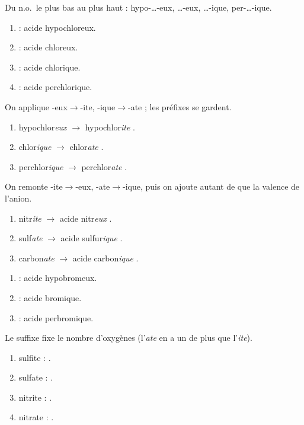 \documentclass[11pt,a4paper]{article}
\begin{document}
\begin{corrige}
Du n.o.\ le plus bas au plus haut : hypo-\ldots-eux, \ldots-eux, \ldots-ique, per-\ldots-ique.
\begin{enumerate}[label=\alph*)]
  \item {} : acide hypochloreux.
  \item {} : acide chloreux.
  \item {} : acide chlorique.
  \item {} : acide perchlorique.
\end{enumerate}
\end{corrige}

\begin{corrige}
On applique -eux$\to$-ite, -ique$\to$-ate ; les préfixes se gardent.
\begin{enumerate}[label=\alph*)]
  \item hypochlor\emph{eux} $\to$ hypochlor\emph{ite} .
  \item chlor\emph{ique} $\to$ chlor\emph{ate} .
  \item perchlor\emph{ique} $\to$ perchlor\emph{ate} .
\end{enumerate}
\end{corrige}

\begin{corrige}
On remonte -ite$\to$-eux, -ate$\to$-ique, puis on ajoute autant de  que la valence de l'anion.
\begin{enumerate}[label=\alph*)]
  \item nitr\emph{ite}  $\to$ acide nitr\emph{eux} .
  \item sulf\emph{ate}  $\to$ acide sulfur\emph{ique} .
  \item carbon\emph{ate}  $\to$ acide carbon\emph{ique} .
\end{enumerate}
\end{corrige}

\begin{corrige}
\begin{enumerate}[label=\alph*)]
  \item {} : acide hypobromeux.
  \item {} : acide bromique.
  \item {} : acide perbromique.
\end{enumerate}
\end{corrige}

\begin{corrige}
Le suffixe fixe le nombre d'oxygènes (l'\emph{ate} en a un de plus que l'\emph{ite}).
\begin{enumerate}[label=\alph*)]
  \item sulfite : .
  \item sulfate : .
  \item nitrite : .
  \item nitrate : .
\end{enumerate}
\end{corrige}
\end{document}
